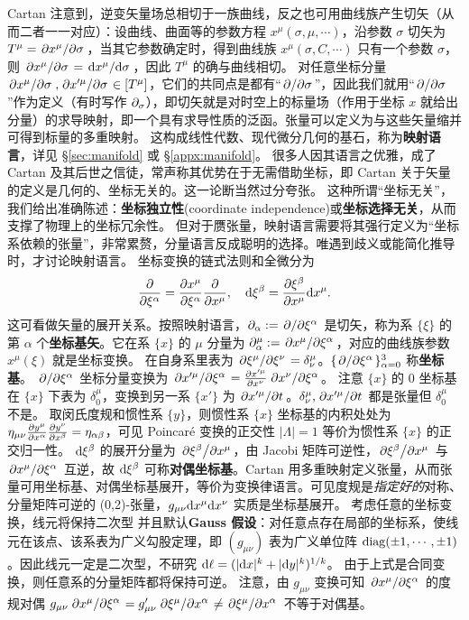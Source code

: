 Cartan 注意到，逆变矢量场总相切于一族曲线，反之也可用曲线族产生切矢（从而二者一一对应）：设曲线、曲面等的参数方程 $x^\mu(\sigma,\mu,\cdots)$，沿参数 $\sigma$ 切矢为 $T^\mu=\pdv*{x^\mu}{\sigma}$，当其它参数确定时，得到曲线族 $x^\mu(\sigma,C,\cdots)$ 只有一个参数 $\sigma$，则 $\pdv*{x^\mu}{\sigma}=\dv*{x^\mu}{\sigma}$，因此 $T^\mu$ 的确与曲线相切。
对任意坐标分量 $\pdv*{x^\mu}{\sigma},\pdv*{x'^\mu}{\sigma}\in [T^\mu]$，它们的共同点是都有“$\pdv*{\sigma}$”，因此我们就用“$\pdv*{\sigma}$”作为定义（有时写作 $\partial_\sigma$），即切矢就是对时空上的标量场（作用于坐标 $x$ 就给出分量）的求导映射，即一个具有求导性质的泛函。张量可以定义为与这些矢量缩并可得到标量的多重映射。
这构成线性代数、现代微分几何的基石，称为\textbf{映射语言}，详见 \S\ref{sec:manifold} 或 \S\ref{appx:manifold}。
很多人因其语言之优雅，成了 Cartan 及其后世之信徒，常声称其优势在于无需借助坐标，即 Cartan 关于矢量的定义是几何的、坐标无关的。这一论断当然过分夸张。
这种所谓“坐标无关”，我们给出准确陈述：\textbf{坐标独立性}(coordinate independence)或\textbf{坐标选择无关}，从而支撑了物理上的坐标冗余性。
但对于赝张量，映射语言需要将其强行定义为“坐标系依赖的张量”，非常累赘，分量语言反成聪明的选择。唯遇到歧义或能简化推导时，才讨论映射语言。
坐标变换的链式法则和全微分为
\[\pdv{\xi^\alpha}=\pdv{x^\mu}{\xi^\alpha}\pdv{x^\mu},\quad \dd\xi^\beta = \pdv{\xi^\beta}{x^\mu} \dd x^\mu.\]
这可看做矢量的展开关系。按照映射语言，$\partial_\alpha:=\pdv*{\xi^\alpha}$ 是切矢，称为系 $\{\xi\}$ 的第 $\alpha$ 个\textbf{坐标基矢}。它在系 $\{x\}$ 的 $\mu$ 分量为 $\partial_\alpha^\mu:=\pdv*{x^\mu}{\xi^\alpha}$，对应的曲线族参数 $x^\mu(\xi)$ 就是坐标变换。
在自身系里表为 $\pdv*{\xi^\mu}{\xi^\nu}=\delta^\mu_\nu$。$\{\pdv*{\xi^\alpha}\}_{\alpha=0}^3$ 称\textbf{坐标基}。
$\pdv*{\xi^\alpha}$ 坐标分量变换为 $\pdv*{x'^\mu}{\xi^\alpha}=\pdv{x'^\mu}{x^\nu}\pdv*{x^\nu}{\xi^\alpha}$。
注意 $\{x\}$ 的 $0$ 坐标基在 $\{x\}$ 下表为 $\delta^\mu_0$，变换到另一系 $\{x'\}$ 为 $\pdv*{x'^\mu}{t}$。$\delta^\mu_\nu,\pdv*{x'^\mu}{t}$ 都是张量但 $\delta^\mu_0$ 不是。
取闵氏度规和惯性系 $\{y\}$，则惯性系 $\{x\}$ 坐标基的内积处处为$\eta_{\mu\nu}\pdv{y^\mu}{x^\alpha}\pdv{y^\nu}{x^\beta}=\eta_{\alpha\beta}$，可见 Poincaré 变换的正交性 $|\Lambda|=1$ 等价为惯性系 $\{x\}$ 的正交归一性。
$\dd\xi^\beta$ 的展开分量为 $\pdv*{\xi^\beta}{x^\mu}$，由 Jacobi 矩阵可逆性，$\pdv*{\xi^\beta}{x^\mu}$ 与 $\pdv*{x^\mu}{\xi^\alpha}$ 互逆，故 $\dd\xi^\beta$ 可称\textbf{对偶坐标基}。Cartan 用多重映射定义张量，从而张量可用坐标基、对偶坐标基展开，等价为变换律语言。可见度规是\emph{指定好的}对称、分量矩阵可逆的 (0,2)-张量，$g_{\mu\nu}\dd x^\mu\dd x^\nu$ 实质是坐标基展开。
考虑任意的坐标变换，线元将保持二次型
并且默认\textbf{Gauss 假设}：对任意点存在局部的坐标系，使线元在该点、该系表为广义勾股定理，即 $(g_{\mu\nu})$ 表为广义单位阵 $\operatorname{diag}(\pm1,\cdots,\pm1)$。因此线元一定是二次型，不研究 $\dd\ell=(|\dd x|^k+|\dd y|^k)^{1/k}$。
由于上式是合同变换，则任意系的分量矩阵都将保持可逆。
注意，由 $g_{\mu\nu}$ 变换可知 $\pdv*{x^\mu}{\xi^\alpha}$ 的度规对偶 $g_{\mu\nu} \pdv*{x^\mu}{\xi^\alpha} = g'_{\mu\nu} \pdv*{\xi^\mu}{x^\alpha}\ne \pdv*{\xi^\mu}{x^\alpha}$ 不等于对偶基。

